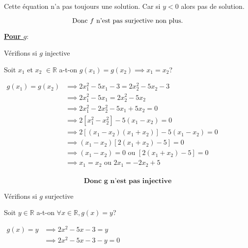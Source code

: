 \documentclass[12pt,a4paper]{article}
\begin{document}
\begin{enumerate}
\begin{enumerate}
          Cette équation n'a pas toujours une solution. Car si \( y<0 \) alors pas de
          solution.

          \begin{resultbox}
            \[
                \mathbf{\text{Donc \( f \) n'est pas surjective non plus.}}
            \]
        \end{resultbox}
          
          \underline{\textbf{Pour \( g \)}}:
          
          Vérifions si \( g \) injective

          Soit \(x_1\) et \(x_2\) \(\in \mathbb{R}\) a-t-on \(g(x_1)=g(x_2)\implies
          x_1=x_2\)?

          \(\begin{aligned}
              g(x_1)=g(x_2) & \implies 2x_1^{2}-5x_1-3=2x_2^{2}-5x_2-3\\
                            & \implies 2x_1^{2}-5x_1=2x_2^{2}-5x_2\\
                            & \implies 2x_1^{2}-2x_2^{2}-5x_1+5x_2 = 0\\
                            & \implies 2[x_1^{2}-x_2^{2}]-5(x_1-x_2) = 0\\
                            & \implies 2[(x_1-x_2)(x_1+x_2)]-5(x_1-x_2) = 0\\
                            & \implies (x_1-x_2)[2(x_1+x_2)-5] = 0\\
                            & \implies (x_1-x_2)=0 \text{ ou } [2(x_1+x_2)-5] = 0\\
                            & \implies x_1=x_2\text{ ou } 2x_1 = -2x_2+5\\
          \end{aligned}\)

          \begin{resultbox}
            \[
                \mathbf{\text{Donc \(g\) n'est pas injective}}
            \]
        \end{resultbox}

        Vérifions si \( g \) surjective

          Soit \(y \in \mathbb{R}\) a-t-on \(\forall x \in \mathbb{R},g(x)=y \)?

          \(
          \begin{aligned}
              g(x)=y & \implies 2x^{2}-5x-3=y \\
                     & \implies 2x^{2}-5x-3-y=0\\
          \end{aligned}
          \)


\end{enumerate}
\end{enumerate}
\end{document}
